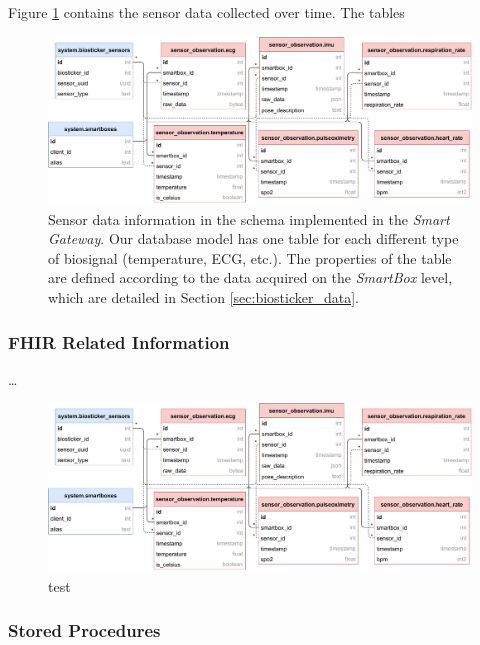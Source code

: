 Figure \ref{fig:wow-dbschema-sensors} contains the sensor data collected over time. The tables 

\begin{figure}[H]
    \centering
    \includegraphics[width=\linewidth]{images/database-schema-sensordata.pdf}
    \caption[Sensor data information in the schema implemented in the \textit{Smart Gateway}.]{
        Sensor data information in the schema implemented in the \textit{Smart Gateway}. Our database model has one table for each different type of biosignal (temperature, \acs{ECG}, etc.). The properties of the table are defined according to the data acquired on the \textit{SmartBox} level, which are detailed in Section \ref{sec:biosticker_data}.}
    \label{fig:wow-dbschema-sensors}
\end{figure}

\subsubsection{FHIR Related Information}
\dots 

\begin{figure}[H]
    \centering
    \includegraphics[width=\linewidth]{images/database-schema-fhir.pdf}
    \caption[test]{test}
    \label{fig:wow-dbschema-fhir}
\end{figure}
 

\subsubsection{Stored Procedures}

